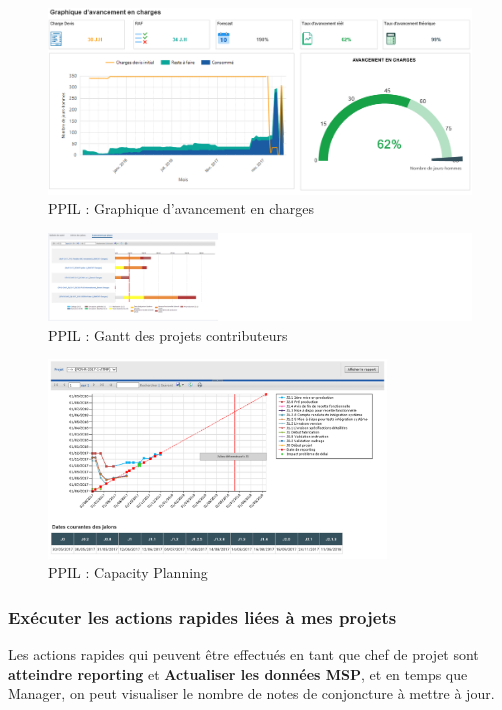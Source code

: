 \begin{figure}[!h]
\centering
\includegraphics[width=1\textwidth]{images/PPIL-avancement.png}
\caption{PPIL : Graphique d'avancement en charges}
\end{figure}


\begin{figure}[!h]
\centering
\includegraphics[width=2.5\textwidth]{images/PPIL-Gantt.png}
\caption{PPIL : Gantt des projets contributeurs}
\end{figure}

\begin{figure}[H]
\centering
\includegraphics[width=0.8\textwidth]{images/temps temps.png}
\caption{PPIL : Capacity Planning}
\end{figure}

\subsubsection{Exécuter les actions rapides liées à mes projets}
Les actions rapides qui peuvent être effectués en tant que chef de projet sont \textbf{atteindre reporting} et \textbf{Actualiser les données MSP}, et en temps que Manager, on peut visualiser le nombre de notes de conjoncture à mettre à jour.

